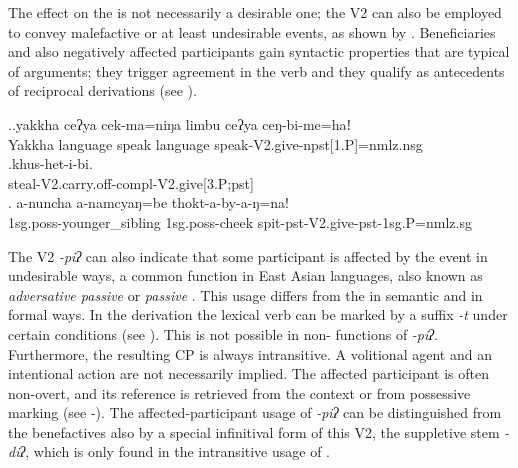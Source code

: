 The effect on the  is not necessarily a desirable one; the V2 can also be employed to 
convey malefactive or at least undesirable events, as shown by \Next. Beneficiaries and also negatively affected participants gain syntactic properties that are typical of arguments; they  trigger agreement in the verb and they qualify as antecedents of reciprocal derivations (see ). 

\ex.\ag.yakkha ceʔya cek-ma=niŋa limbu ceʔya ceŋ-bi-me=haǃ\\
Yakkha language  speak  language speak{\sc -V2.give-npst[1.P]=nmlz.nsg}\\
\bg.khus-het-i-bi.\\
steal{\sc -V2.carry.off-compl-V2.give[3.P;pst]}\\
\bg. a-nuncha a-namcyaŋ=be thokt-a-by-a-ŋ=na!\\
{\sc 1sg.poss-}younger\_sibling {\sc 1sg.poss-}cheek  spit{\sc -pst-V2.give-pst-1sg.P=nmlz.sg}\\


The   V2 \emph{-piʔ}  can also indicate that some participant is affected by the event in undesirable ways, a common function in East Asian languages, also known as \emph{adversative passive} or \emph{ passive} \citep{Keenanetal2007Passives, Yapetal1998_give}. This usage differs from the  in semantic and in formal ways.  In the  derivation the lexical verb can be marked by a suffix \emph{-t} under certain conditions (see ). This is not possible in non- functions of  \emph{-piʔ}.  Furthermore, the resulting CP is always intransitive. A volitional agent  and an intentional action are not necessarily implied. The affected participant is often non-overt, and its reference is retrieved from the context or from possessive marking (see \Next[c]-\Next[d]). The affected-participant usage of \emph{-piʔ} can be distinguished from the benefactives also by a special infinitival form of this V2, the suppletive stem \emph{-diʔ}, which is only found in the intransitive usage of . 

